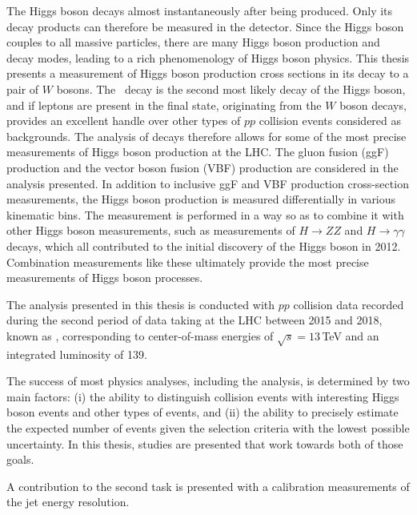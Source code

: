 The Higgs boson decays almost instantaneously after being produced. Only its decay products can therefore be measured in the detector. Since the Higgs boson couples to all massive particles, there are many Higgs boson production and decay modes, leading to a rich phenomenology of Higgs boson physics. 
This thesis presents a measurement of Higgs boson production cross sections in its decay to a pair of $W$ bosons. 
The \HWW\ decay is the second most likely decay of the Higgs boson, and if leptons are present in the final state, originating from the $W$ boson decays, provides an excellent handle over other types of $pp$ collision events considered as backgrounds.
The analysis of \HWWdet decays therefore allows for some of the most precise measurements of Higgs boson production at the LHC.
The gluon fusion (ggF) production and the vector boson fusion (VBF) production are considered in the analysis presented. 
In addition to inclusive ggF and VBF production cross-section measurements, the Higgs boson production is measured differentially in various kinematic bins. 
The measurement is performed in a way so as to combine it with other Higgs boson measurements, such as measurements of $H \to ZZ$ and $H \to \gamma\gamma$ decays, which all contributed to the initial discovery of the Higgs boson in 2012. 
Combination measurements like these ultimately provide the most precise measurements of Higgs boson processes.

The \HWWdet analysis presented in this thesis is conducted with $pp$ collision data recorded during the second period of data taking at the LHC between 2015 and 2018, known as \RunTwo, corresponding to center-of-mass energies of $\sqrt{s} = 13\,$TeV and an integrated luminosity of 139\ifb.

The success of most physics analyses, including the \HWWdet analysis, is determined by two main factors: 
(i) the ability to distinguish collision events with interesting Higgs boson events and other types of events, and (ii) the ability to precisely estimate the expected number of events given the selection criteria with the lowest possible uncertainty.
In this thesis, studies are presented that work towards both of those goals.

A contribution to the second task is presented with a calibration measurements of the jet energy resolution. 

